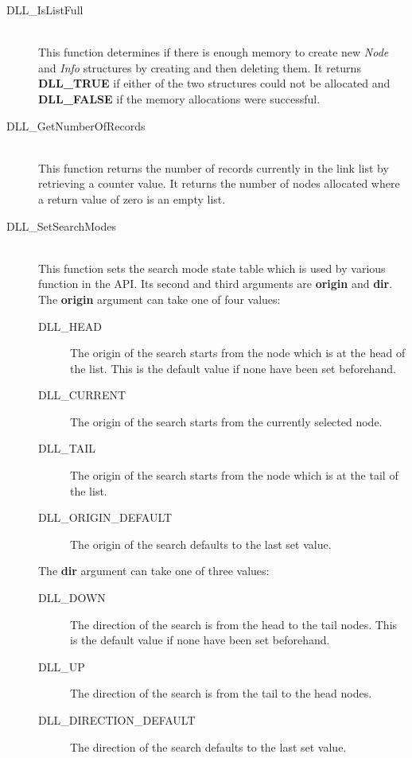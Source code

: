 \documentclass[10pt,letterpaper,titlepage]{article}
\begin{document}
\begin{description}
\begin{description}
 \item[DLL\_IsListFull]\quad\\
 This function determines if there is enough memory to create new \emph{Node} and \emph{Info} structures by creating and then deleting them.  It returns \textbf{DLL\_TRUE} if either of the two structures could not be allocated and \textbf{DLL\_FALSE} if the memory allocations were successful.

 \item[DLL\_GetNumberOfRecords]\quad\\
 This function returns the number of records currently in the link list by retrieving a counter value.  It returns the number of nodes allocated where a return value of zero is an empty list.

 \item[DLL\_SetSearchModes]\quad\\
 This function sets the search mode state table which is used by various function in the API.  Its second and third arguments are \textbf{origin} and \textbf{dir}.  The \textbf{origin} argument can take one of four values:

  \begin{description}
  \item[DLL\_HEAD] The origin of the search starts from the node which is at the head of the list.  This is the default value if none have been set beforehand.
  \item[DLL\_CURRENT] The origin of the search starts from the currently selected node.
  \item[DLL\_TAIL] The origin of the search starts from the node which is at the tail of the list.
  \item[DLL\_ORIGIN\_DEFAULT] The origin of the search defaults to the last set value.
  \end{description}

 The \textbf{dir} argument can take one of three values:

  \begin{description}
  \item[DLL\_DOWN] The direction of the search is from the head to the tail nodes.  This is the default value if none have been set beforehand.
  \item[DLL\_UP] The direction of the search is from the tail to the head nodes.
  \item[DLL\_DIRECTION\_DEFAULT] The direction of the search defaults to the last set value.
  \end{description}


\end{description}
\end{description}
\end{document}
